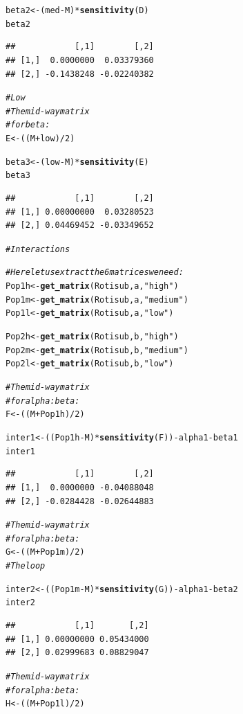 \documentclass{article}\usepackage[]{graphicx}\usepackage[]{color}
\makeatletter
\newcommand{\hlnum}[1]{\textcolor[rgb]{0.686,0.059,0.569}{#1}}%
\newcommand{\hlstr}[1]{\textcolor[rgb]{0.192,0.494,0.8}{#1}}%
\newcommand{\hlcom}[1]{\textcolor[rgb]{0.678,0.584,0.686}{\textit{#1}}}%
\newcommand{\hlopt}[1]{\textcolor[rgb]{0,0,0}{#1}}%
\newcommand{\hlstd}[1]{\textcolor[rgb]{0.345,0.345,0.345}{#1}}%
\newcommand{\hlkwb}[1]{\textcolor[rgb]{0.69,0.353,0.396}{#1}}%
\newcommand{\hlkwd}[1]{\textcolor[rgb]{0.737,0.353,0.396}{\textbf{#1}}}%
\newenvironment{kframe}{%
 \def\at@end@of@kframe{}%
 \ifinner\ifhmode%
  \def\at@end@of@kframe{\end{minipage}}%
  \begin{minipage}{\columnwidth}%
 \fi\fi%
 \def\FrameCommand##1{\hskip\@totalleftmargin \hskip-\fboxsep
 \colorbox{shadecolor}{##1}\hskip-\fboxsep
     \hskip-\linewidth \hskip-\@totalleftmargin \hskip\columnwidth}%
 \MakeFramed {\advance\hsize-\width
   \@totalleftmargin\z@ \linewidth\hsize
   \@setminipage}}%
 {\par\unskip\endMakeFramed%
 \at@end@of@kframe}
\newenvironment{knitrout}{}{} %
\makeatother
\begin{document}
\begin{knitrout}
\begin{kframe}
\begin{alltt}
\hlstd{beta2}\hlkwb{<-}\hlstd{(med}\hlopt{-}\hlstd{M)}\hlopt{*}\hlkwd{sensitivity}\hlstd{(D)}
\hlstd{beta2}
\end{alltt}
\begin{verbatim}
##            [,1]        [,2]
## [1,]  0.0000000  0.03379360
## [2,] -0.1438248 -0.02240382
\end{verbatim}
\begin{alltt}
  \hlcom{#Low}
       \hlcom{#The mid-way matrix }
\hlcom{#for beta:}
\hlstd{E}\hlkwb{<-}\hlstd{((M}\hlopt{+}\hlstd{low)}\hlopt{/}\hlnum{2}\hlstd{)}

\hlstd{beta3}\hlkwb{<-}\hlstd{(low}\hlopt{-}\hlstd{M)}\hlopt{*}\hlkwd{sensitivity}\hlstd{(E)}
\hlstd{beta3}
\end{alltt}
\begin{verbatim}
##            [,1]        [,2]
## [1,] 0.00000000  0.03280523
## [2,] 0.04469452 -0.03349652
\end{verbatim}
\begin{alltt}
\hlcom{#Interactions}

\hlcom{#Here let us extract the 6 matrices we need:}
\hlstd{Pop1h}\hlkwb{<-}\hlkwd{get_matrix}\hlstd{(Rotisub, a,} \hlstr{"high"}\hlstd{)}
\hlstd{Pop1m}\hlkwb{<-}\hlkwd{get_matrix}\hlstd{(Rotisub, a,} \hlstr{"medium"}\hlstd{)}
\hlstd{Pop1l}\hlkwb{<-}\hlkwd{get_matrix}\hlstd{(Rotisub, a,} \hlstr{"low"}\hlstd{)}

\hlstd{Pop2h}\hlkwb{<-}\hlkwd{get_matrix}\hlstd{(Rotisub, b,} \hlstr{"high"}\hlstd{)}
\hlstd{Pop2m}\hlkwb{<-}\hlkwd{get_matrix}\hlstd{(Rotisub, b,} \hlstr{"medium"}\hlstd{)}
\hlstd{Pop2l}\hlkwb{<-}\hlkwd{get_matrix}\hlstd{(Rotisub, b,} \hlstr{"low"}\hlstd{)}

       \hlcom{#The mid-way matrix }
\hlcom{#for alpha:beta:}
\hlstd{F}\hlkwb{<-}\hlstd{((M}\hlopt{+}\hlstd{Pop1h)}\hlopt{/}\hlnum{2}\hlstd{)}

\hlstd{inter1}\hlkwb{<-}\hlstd{((Pop1h}\hlopt{-}\hlstd{M)}\hlopt{*}\hlkwd{sensitivity}\hlstd{(F))}\hlopt{-}\hlstd{alpha1}\hlopt{-}\hlstd{beta1}
\hlstd{inter1}
\end{alltt}
\begin{verbatim}
##            [,1]        [,2]
## [1,]  0.0000000 -0.04088048
## [2,] -0.0284428 -0.02644883
\end{verbatim}
\begin{alltt}
       \hlcom{#The mid-way matrix }
\hlcom{#for alpha:beta:}
\hlstd{G}\hlkwb{<-}\hlstd{((M}\hlopt{+}\hlstd{Pop1m)}\hlopt{/}\hlnum{2}\hlstd{)}
\hlcom{#The loop}

\hlstd{inter2}\hlkwb{<-}\hlstd{((Pop1m}\hlopt{-}\hlstd{M)}\hlopt{*}\hlkwd{sensitivity}\hlstd{(G))}\hlopt{-}\hlstd{alpha1}\hlopt{-}\hlstd{beta2}
\hlstd{inter2}
\end{alltt}
\begin{verbatim}
##            [,1]       [,2]
## [1,] 0.00000000 0.05434000
## [2,] 0.02999683 0.08829047
\end{verbatim}
\begin{alltt}
\hlcom{#The mid-way matrix }
\hlcom{#for alpha:beta:}
\hlstd{H}\hlkwb{<-}\hlstd{((M}\hlopt{+}\hlstd{Pop1l)}\hlopt{/}\hlnum{2}\hlstd{)}


\end{alltt}
\end{kframe}
\end{knitrout}
\end{document}

